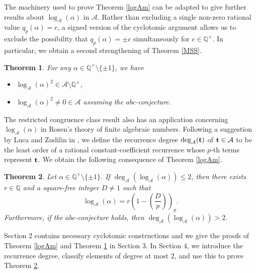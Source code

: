 \documentclass[12pt,reqno]{amsart}
\newtheorem{theorem}{Theorem}[section]
\theoremstyle{remark}
\newcommand{\cA}{\mathcal A}
\newcommand{\leg}[2]{\left(\frac{#1}{#2}\right)}
\begin{document}
The machinery used to prove Theorem \ref{logAm} can be adapted to give further results about $\log_\cA(\alpha)$ in $\cA$. 
Rather than excluding a single non-zero rational value $q_p(\alpha)=c$, a signed version of the cyclotomic argument allows us to exclude the possibility that $q_p(\alpha)=\pm c$ simultaneously for $c\in\mathbb{Q}^\times$. 
In particular, we obtain a second strengthening of Theorem \ref{MSS}.
\begin{theorem}\label{logsquare}
For any $\alpha\in\mathbb{Q}^\times\setminus\{\pm 1\}$, we have 
\begin{itemize}
\item[(i)]
$\log_\cA(\alpha)^2\in\cA\setminus\mathbb{Q}^{\times}$, 
\item[(ii)]
$\log_\cA(\alpha)^2\neq 0\in\cA$ assuming the $abc$-conjecture.
\end{itemize}
\end{theorem}

The restricted congruence class result also has an application concerning $\log_\cA(\alpha)$ in Rosen's theory of finite algebraic numbers. Following a suggestion by Luca and Zudilin in \cite{LZ25}, we define the recurrence degree $\deg_\cA({\bf t})$ of ${\bf t}\in\cA$ to be the least order of a rational constant-coefficient recurrence whose $p$-th terms represent ${\bf t}$. We obtain the following consequence of Theorem \ref{logAm}.
\begin{theorem}\label{degtwo}
Let $\alpha\in\mathbb{Q}^\times\setminus\{\pm 1\}$. If $\deg_\cA(\log_\cA(\alpha))\leq 2$, 
then there exists $r\in\mathbb{Q}$ and a square-free integer $D\neq 1$ such that
\[\log_\cA(\alpha)=r\left(1-\leg{D}{p}\right)_p.\]
Furthermore, if the $abc$-conjecture holds, then $\deg_\cA(\log_\cA(\alpha))>2$. 
\end{theorem}
Section 2 contains necessary cyclotomic constructions and we give the proofs of Theorem \ref{logAm} and Theorem \ref{logsquare} in Section 3. In Section 4, we introduce the recurrence degree, classify elements of degree at most 2, and use this to prove Theorem \ref{degtwo}. 


 
\end{document}
